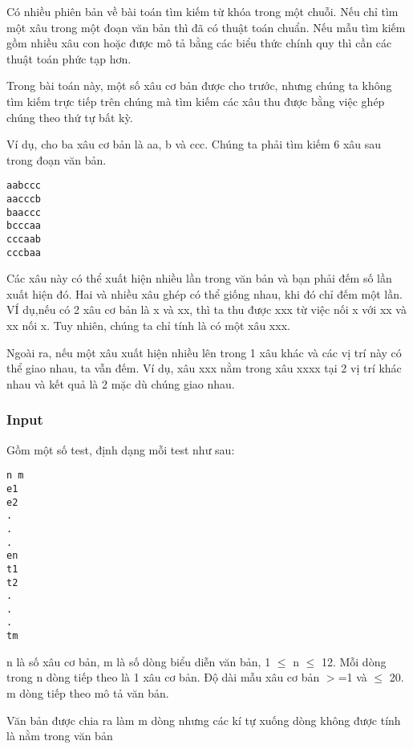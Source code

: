 





   Có nhiều phiên bản về bài toán tìm kiếm từ khóa trong một chuỗi.  Nếu chỉ tìm một xâu trong một đoạn văn bản thì đã có thuật toán chuẩn. Nếu mẫu tìm kiếm gồm nhiều xâu con hoặc được mô tả bằng các biểu thức chính quy thì cần các thuật toán phức tạp hơn.  

   Trong bài toán này, một số xâu cơ bản được cho trước, nhưng chúng ta không tìm kiếm trực tiếp trên chúng mà tìm kiếm các xâu thu được bằng việc ghép chúng theo thứ tự bất kỳ.  

   Ví dụ, cho ba xâu cơ bản là aa, b và ccc. Chúng ta phải tìm kiếm 6 xâu sau trong đoạn văn bản.  
\begin{verbatim}
aabccc
aacccb
baaccc
bcccaa
cccaab
cccbaa
\end{verbatim}

   Các xâu này có thể xuất hiện nhiều lần trong văn bản và bạn phải đếm số lần xuất hiện đó. Hai và nhiều xâu ghép có thể giống nhau, khi đó chỉ đếm một lần. VÍ dụ,nếu có 2 xâu cơ bản là x và xx, thì ta thu được xxx từ việc nối x với xx và xx nối x. Tuy nhiên, chúng ta chỉ tính là có một xâu xxx.  

   Ngoài ra, nếu một xâu xuất hiện nhiều lên trong 1 xâu khác và các vị trí này có thể giao nhau, ta vẫn đếm. Ví dụ, xâu xxx nằm trong xâu xxxx tại 2 vị trí khác nhau và kết quả là 2 mặc dù chúng giao nhau.  



\subsubsection{   Input  }



   Gồm một số test, định dạng mỗi test như sau:  
\begin{verbatim}
n m
e1
e2
.
.
.
en
t1
t2
.
.
.
tm
\end{verbatim}

   n là số xâu cơ bản, m là số dòng biểu diễn văn bản, 1 $\le$ n $\le$ 12. Mỗi dòng trong n dòng tiếp theo là 1 xâu cơ bản. Độ dài mẫu xâu cơ bản $>$=1 và  $\le$  20. m dòng tiếp theo mô tả văn bản.  

   Văn bản được chia ra làm m dòng nhưng các kí tự xuống dòng không được tính là nằm trong văn bản  

